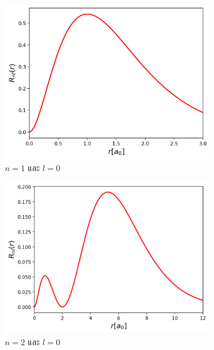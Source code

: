 \begin{figure}[H]
    \centering
    \begin{subfigure}{0.5\textwidth}
        \centering
        \includegraphics[width=0.9\linewidth]{fig/wfn_hydro_radial_n1_l0.png}
        \caption{$n = 1$ และ $l = 0$}
        \label{fig:wfn_hydro_radial_n1_l0}
    \end{subfigure}%
    \begin{subfigure}{0.5\textwidth}
        \centering
        \includegraphics[width=0.9\linewidth]{fig/wfn_hydro_radial_n2_l0.png}
        \caption{$n = 2$ และ $l = 0$}
        \label{fig:wfn_hydro_radial_n2_l0}
    \end{subfigure}
    \\
    \vspace{1em}
    \begin{subfigure}{0.5\textwidth}
        \centering

\end{subfigure}
\end{figure}
